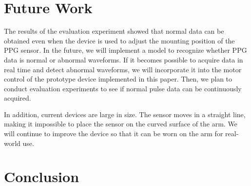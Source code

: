 \documentclass[sigconf]{acmart}
\begin{document}
\section{Future Work}
\label{sec:future_work}
The results of the evaluation experiment showed that normal data can be obtained even when the device is used to adjust the mounting position of the PPG sensor. In the future, we will implement a model to recognize whether PPG data is normal or abnormal waveforms. If it becomes possible to acquire data in real time and detect abnormal waveforms, we will incorporate it into the motor control of the prototype device implemented in this paper. Then, we plan to conduct evaluation experiments to see if normal pulse data can be continuously acquired.\par

In addition, current devices are large in size. The sensor moves in a straight line, making it impossible to place the sensor on the curved surface of the arm. We will continue to improve the device so that it can be worn on the arm for real-world use.



\section{Conclusion}
\label{sec:conclution}
\end{document}
